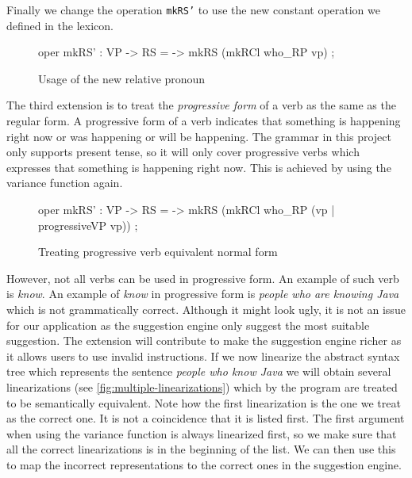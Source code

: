 Finally we change the operation \texttt{mkRS'} to use the new constant operation we defined in the lexicon.

\begin{figure}[H]
\begin{code}
oper
  mkRS' : VP -> RS = \vp -> mkRS (mkRCl who_RP vp) ;
\end{code}
\caption{Usage of the new relative pronoun\label{fig:add-lexicon-incomplete-grammar}}
\end{figure}

The third extension is to treat the \emph{progressive form} of a verb as the same as the regular form. A progressive form of a verb indicates that something is happening right now or was happening or will be happening. The grammar in this project only supports present tense, so it will only cover progressive verbs which expresses that something is happening right now. This is achieved by using the variance function again.

\begin{figure}[H]
\begin{code}
oper
  mkRS' : VP -> RS = \vp -> mkRS (mkRCl who_RP (vp | progressiveVP vp)) ;
\end{code}
\caption{Treating progressive verb equivalent normal form\label{fig:linearize-using-list}}
\end{figure}

However, not all verbs can be used in progressive form. An example of such verb is \emph{know}. An example of  \emph{know} in progressive form is \emph{people who are knowing Java} which is not grammatically correct. Although it might look ugly, it is not an issue for our application as the suggestion engine only suggest the most suitable suggestion. The extension will contribute to make the suggestion engine richer as it allows users to use invalid instructions.
\newline
\newline
If we now linearize the abstract syntax tree which represents the sentence \emph{people who know Java} we will obtain several linearizations (see \autoref{fig:multiple-linearizations}) which by the program are treated to be semantically equivalent. Note how the first linearization is the one we treat as the correct one. It is not a coincidence that it is listed first. The first argument when using the variance function is always linearized first, so we make sure that all the correct linearizations is in the beginning of the list. We can then use this to map the incorrect representations to the correct ones in the suggestion engine.

